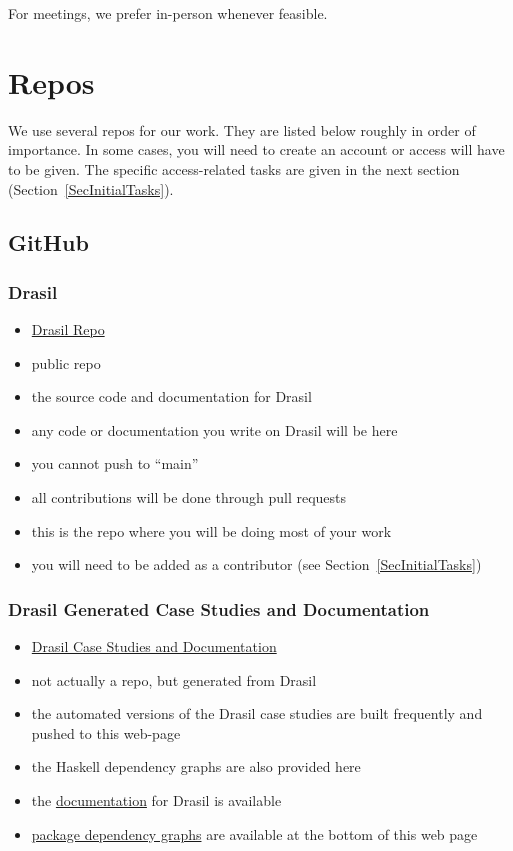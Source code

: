 \documentclass[12pt]{article}
\begin{document}
For meetings, we prefer in-person whenever feasible.

\section {Repos} \label{SecRepos}

We use several repos for our work.  They are listed below roughly in order of
importance.  In some cases, you will need to create an account or access will
have to be given.  The specific access-related tasks are given in the next
section (Section~\ref{SecInitialTasks}).

\subsection{GitHub}

\subsubsection{Drasil}
\begin{itemize}
\item \href{https://github.com/JacquesCarette/Drasil} {Drasil Repo}
\item public repo
\item the source code and documentation for Drasil
\item any code or documentation you write on Drasil will be here
\item you cannot push to ``main''
\item all contributions will be done through pull requests
\item this is the repo where you will be doing most of your work
\item you will need to be added as a contributor (see Section~\ref{SecInitialTasks})
\end{itemize}

\subsubsection{Drasil Generated Case Studies and Documentation}
\begin{itemize}
\item \href{https://jacquescarette.github.io/Drasil/} {Drasil Case Studies and Documentation}
\item not actually a repo, but generated from Drasil
\item the automated versions of the Drasil case studies are built frequently and
pushed to this web-page
\item the Haskell dependency graphs are also provided here
\item the \href{https://jacquescarette.github.io/Drasil/docs/index.html}
{documentation} for Drasil is available
\item \href{https://jacquescarette.github.io/Drasil/} {package dependency
graphs} are available at the bottom of this web page
\end{itemize}
\end{document}
